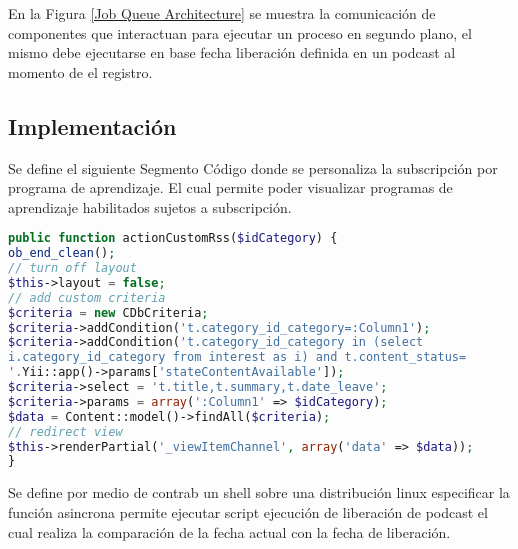 \begin{minipage}{1.0\textwidth}
	\centering
	\label{Aplicaci\'{o}n de solo autentificaci\'{o}n}
\end{minipage}

En la Figura \ref{Job Queue Architecture} se muestra la comunicaci\'{o}n de
componentes que interactuan para ejecutar un proceso en segundo plano, el mismo
debe ejecutarse en base fecha liberaci\'{o}n definida en un podcast al 
momento de el registro.   

\begin{minipage}{1.0\textwidth}
	\centering
	\label{Job Queue Architecture}
\end{minipage}
	
\subsection{Implementaci\'{o}n}

Se define el siguiente Segmento C\'{o}digo donde se personaliza la subscripci\'{o}n
por programa de aprendizaje. El cual permite poder visualizar programas de 
aprendizaje habilitados sujetos a subscripci\'{o}n.

\begin{lstlisting}[language = PHP]
public function actionCustomRss($idCategory) {
ob_end_clean();
// turn off layout
$this->layout = false;
// add custom criteria
$criteria = new CDbCriteria;
$criteria->addCondition('t.category_id_category=:Column1');
$criteria->addCondition('t.category_id_category in (select 
i.category_id_category from interest as i) and t.content_status=
'.Yii::app()->params['stateContentAvailable']);
$criteria->select = 't.title,t.summary,t.date_leave';
$criteria->params = array(':Column1' => $idCategory);
$data = Content::model()->findAll($criteria);
// redirect view
$this->renderPartial('_viewItemChannel', array('data' => $data));
}
\end{lstlisting}

Se define por medio de contrab un shell sobre una distribuci\'{o}n linux 
especificar la funci\'{o}n asincrona permite ejecutar script ejecuci\'{o}n
de liberaci\'{o}n de podcast el cual realiza la comparaci\'{o}n de la fecha
actual con la fecha de liberaci\'{o}n.

